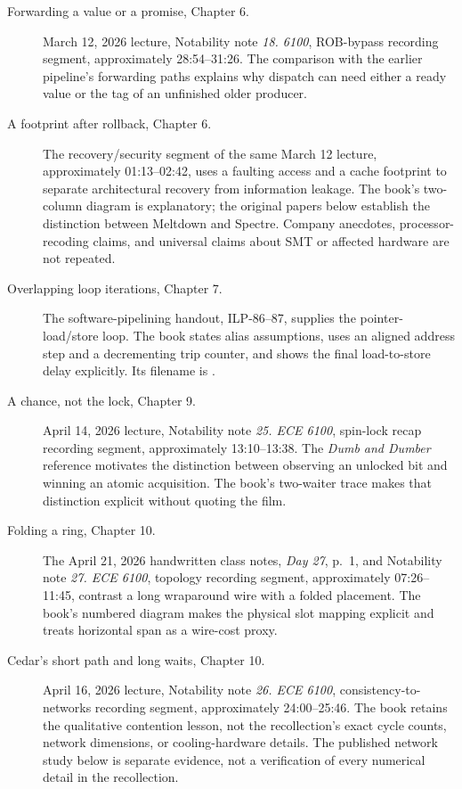 \begin{description}
  \item[Forwarding a value or a promise, Chapter 6.] March 12, 2026 lecture, Notability note \emph{18. 6100}, ROB-bypass recording segment, approximately 28:54--31:26. The comparison with the earlier pipeline's forwarding paths explains why dispatch can need either a ready value or the tag of an unfinished older producer.
  \item[A footprint after rollback, Chapter 6.] The recovery/security segment of the same March 12 lecture, approximately 01:13--02:42, uses a faulting access and a cache footprint to separate architectural recovery from information leakage. The book's two-column diagram is explanatory; the original papers below establish the distinction between Meltdown and Spectre. Company anecdotes, processor-recoding claims, and universal claims about SMT or affected hardware are not repeated.
  \item[Overlapping loop iterations, Chapter 7.] The software-pipelining handout, ILP-86--87, supplies the pointer-load/store loop. The book states alias assumptions, uses an aligned address step and a decrementing trip counter, and shows the final load-to-store delay explicitly. Its filename is .
  \item[A chance, not the lock, Chapter 9.] April 14, 2026 lecture, Notability note \emph{25. ECE 6100}, spin-lock recap recording segment, approximately 13:10--13:38. The \emph{Dumb and Dumber} reference motivates the distinction between observing an unlocked bit and winning an atomic acquisition. The book's two-waiter trace makes that distinction explicit without quoting the film.
  \item[Folding a ring, Chapter 10.] The April 21, 2026 handwritten class notes, \emph{Day 27}, p.\ 1, and Notability note \emph{27. ECE 6100}, topology recording segment, approximately 07:26--11:45, contrast a long wraparound wire with a folded placement. The book's numbered diagram makes the physical slot mapping explicit and treats horizontal span as a wire-cost proxy.
  \item[Cedar's short path and long waits, Chapter 10.] April 16, 2026 lecture, Notability note \emph{26. ECE 6100}, consistency-to-networks recording segment, approximately 24:00--25:46. The book retains the qualitative contention lesson, not the recollection's exact cycle counts, network dimensions, or cooling-hardware details. The published network study below is separate evidence, not a verification of every numerical detail in the recollection.

\end{description}
